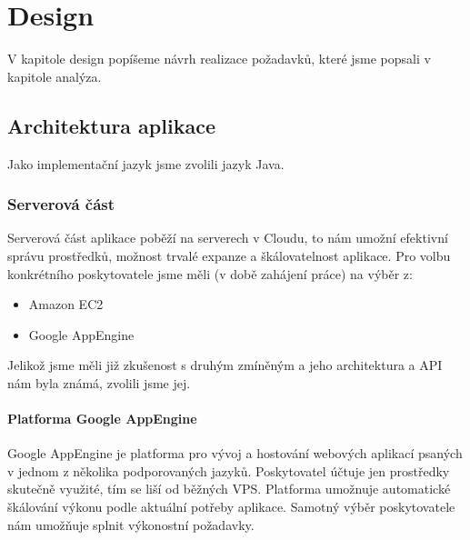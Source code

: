 \chapter{Design}

V kapitole design popíšeme návrh realizace požadavků, které jsme popsali v kapitole analýza.

\section{Architektura aplikace}

Jako implementační jazyk jsme zvolili jazyk Java.

\subsection{Serverová část}

Serverová část aplikace poběží na serverech v Cloudu, to nám umožní efektivní správu prostředků, možnost trvalé expanze a škálovatelnost aplikace.
Pro volbu konkrétního poskytovatele jsme měli (v době zahájení práce) na výběr z:
\begin{itemize}
	\item Amazon EC2
	\item Google AppEngine
\end{itemize}

Jelikož jsme měli již zkušenost s druhým zmíněným a jeho architektura a API nám byla známá, zvolili jsme jej.

\subsubsection{Platforma Google AppEngine}

Google AppEngine je platforma pro vývoj a hostování webových aplikací psaných v jednom z několika podporovaných jazyků.
Poskytovatel účtuje jen prostředky skutečně využité, tím se liší od běžných VPS.
Platforma umožnuje automatické škálování výkonu podle aktuální potřeby aplikace.
Samotný výběr poskytovatele nám umožňuje splnit výkonostní požadavky.

